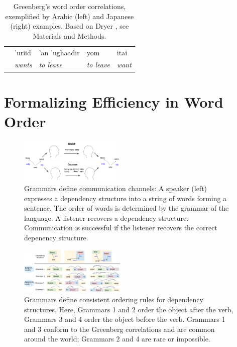 \documentclass[9pt,twocolumn,twoside,lineno]{pnas-new}
\begin{document}
\begin{table}
\begin{center}
\begin{tabular}{|c|ll|ll|}
	\multirow{2}{*}{\raisebox{.5pt}{\textcircled{\raisebox{-.9pt} {8}}}}	&'uriid    &    'an 'ughaadir         & 	yom & itai \\
	& \emph{wants}   &  \emph{to leave}  &	\emph{to leave} & \emph{want} \\ \hline \hline
\end{tabular}
	\end{center}
	\caption{Greenberg's word order correlations, exemplified by Arabic (left) and Japanese (right) examples. Based on Dryer \cite{dryer1992greenbergian}, see Materials and Methods.}\label{table:corr-dryer}
\end{table}





\section{Formalizing Efficiency in Word Order}


\begin{figure}
    \centering
    \includegraphics[width=0.45\textwidth]{figures/communication-two-langs.png}
	\caption{Grammars define communication channels: A speaker (left) expresses a dependency structure into a string of words forming a sentence. The order of words is determined by the grammar of the language. A listener recovers a dependency structure. Communication is successful if the listener recovers the correct depenency structure.}
	\label{fig:comm}
\end{figure}



\begin{figure}
    \centering
    \includegraphics[width=0.45\textwidth]{figures/grammars-langs.png}
	\caption{Grammars define consistent ordering rules for dependency structures. Here, Grammars 1 and 2 order the object after the verb, Grammars 3 and 4 order the object before the verb. Grammars 1 and 3 conform to the Greenberg correlations and are common around the world; Grammars 2 and 4 are rare or impossible.}
	\label{fig:grammars}
\end{figure}
\end{document}
